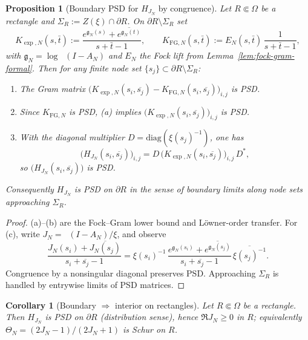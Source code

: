 \documentclass[11pt]{article}
\newtheorem{proposition}[theorem]{Proposition}
\newtheorem{corollary}[theorem]{Corollary}
\theoremstyle{remark}
\DeclareMathOperator{\dettwo}{det_2}
\begin{document}
\begin{proposition}[Boundary PSD for $H_{J_N}$ by congruence]\label{prop:boundary-psd-fixed}
Let $R\Subset\Omega$ be a rectangle and $\Sigma_R:=Z(\xi)\cap\partial R$. On $\partial R\setminus\Sigma_R$ set
\[
K_{\exp,N}(s,\bar t):=\frac{e^{\mathfrak g_N(s)}+\overline{e^{\mathfrak g_N(t)}}}{s+\bar t-1},\qquad 
K_{\mathrm{FG},N}(s,\bar t):=E_N(s,\bar t)\,\frac{1}{s+\bar t-1},
\]
with $\mathfrak g_N=\log\dettwo(I-A_N)$ and $E_N$ the Fock lift from Lemma~\ref{lem:fock-gram-formal}. Then for any finite node set $\{s_j\}\subset\partial R\setminus\Sigma_R$:
\begin{enumerate}
\item[\textup{(a)}] The Gram matrix $\big(K_{\exp,N}(s_i,\overline{s_j})-K_{\mathrm{FG},N}(s_i,\overline{s_j})\big)_{i,j}$ is PSD.
\item[\textup{(b)}] Since $K_{\mathrm{FG},N}$ is PSD, (a) implies $\big(K_{\exp,N}(s_i,\overline{s_j})\big)_{i,j}$ is PSD.
\item[\textup{(c)}] With the diagonal multiplier $D=\mathrm{diag}(\xi(s_j)^{-1})$, one has
\[
\Big(H_{J_N}(s_i,\overline{s_j})\Big)_{i,j}=D\,\Big(K_{\exp,N}(s_i,\overline{s_j})\Big)_{i,j}\,D^{*},
\]
so $\big(H_{J_N}(s_i,\overline{s_j})\big)$ is PSD.
\end{enumerate}
Consequently $H_{J_N}$ is PSD on $\partial R$ in the sense of boundary limits along node sets approaching $\Sigma_R$.
\end{proposition}
\begin{proof}
(a)–(b) are the Fock–Gram lower bound and Löwner-order transfer. For (c), write $J_N=\dettwo(I-A_N)/\xi$, and observe
\[\frac{J_N(s_i)+\overline{J_N(s_j)}}{s_i+\overline{s_j}-1}=\xi(s_i)^{-1}\,\frac{e^{\mathfrak g_N(s_i)}+\overline{e^{\mathfrak g_N(s_j)}}}{s_i+\overline{s_j}-1}\,\overline{\xi(s_j)^{-1}}.\]
Congruence by a nonsingular diagonal preserves PSD. Approaching $\Sigma_R$ is handled by entrywise limits of PSD matrices.
\end{proof}

\begin{corollary}[Boundary $\Rightarrow$ interior on rectangles]\label{cor:bdry-to-int}
Let $R\Subset\Omega$ be a rectangle. Then $H_{J_N}$ is PSD on $\partial R$ (distribution sense), hence $\Re J_N\ge 0$ in $R$; equivalently $\Theta_N=(2J_N-1)/(2J_N+1)$ is Schur on $R$.
\end{corollary}
\end{document}
